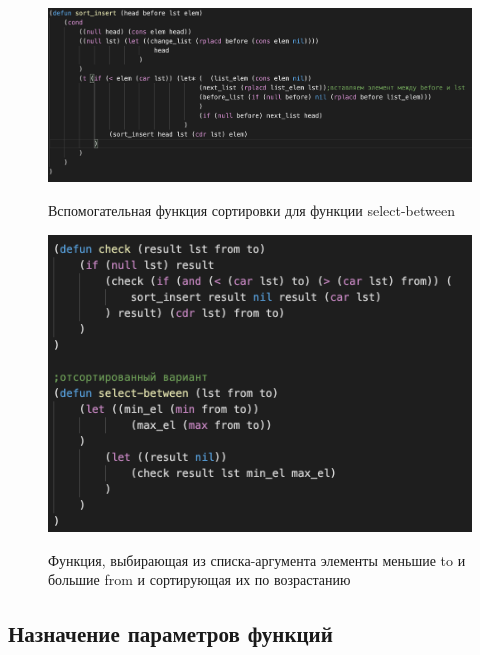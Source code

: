 \documentclass[a4paper,12pt]{article}
\begin{document}
	\begin{figure}[h!]
		\begin{center}
			{\includegraphics[scale = 0.65]{8.3.png}}
			\label{ris:8.2}
		\end{center}
	\caption{Вспомогательная функция сортировки для функции select-between}
	\end{figure}

	\newpage

	\begin{figure}[h!]
		\begin{center}
			{\includegraphics[scale = 1.0]{8.2.png}}
			\label{ris:8.3}
		\end{center}
	\caption{Функция, выбирающая из списка-аргумента элементы меньшие to и большие from и сортирующая их по возрастанию}
	\end{figure}
	
	\subsection*{Назначение параметров функций}
	
\end{document}
